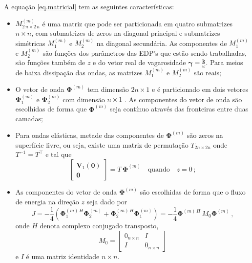 A equa\c{c}\~ao \ref{eq.matricial} tem as seguintes caracter\'isticas:
\begin{itemize}
\item $M^{(m)}_{2\,n\times2\,n}$ \'e uma matriz que pode ser particionada em quatro submatrizes $n\times n$, com submatrizes de zeros na diagonal principal e submatrizes sim\'etricas $M_1^{(m)}$ e $M_2^{(m)}$ na diagonal secund\'aria. As componentes de $M_1^{(m)}$ e $M_2^{(m)}$ s\~ao fun\c{c}\~oes dos par\^ametros das EDP's que est\~ao sendo trabalhadas, s\~ao fun\c{c}\~oes tamb\'em de $z$ e do vetor real de vagarosidade $\pmb{\gamma}=\frac{\mathbf{k}}{\omega}$. Para meios de baixa dissipa\c{c}\~ao das ondas, as matrizes $M_1^{(m)}$ e $M_2^{(m)}$ s\~ao reais; 
\item O vetor de onda $\mathbf{\Phi}^{(m)}$ tem dimens\~ao $2n\times1$ e \'e particionado em dois vetores $\mathbf{\Phi}^{(m)}_1$ e $\mathbf{\Phi}^{(m)}_2$ com dimens\~ao $n\times1$ . As componentes do vetor de onda s\~ao escolhidas de forma que $\mathbf{\Phi}^{(m)}$ seja cont\'inuo atrav\'es das fronteiras entre duas camadas;
\item  Para ondas el\'asticas, metade das componentes de $\mathbf{\Phi}^{(m)}$ s\~ao zeros na superf\'icie livre, ou seja, existe uma matriz de permuta\c{c}\~ao $T_{2n\times2n}$ onde $T^{-1}=T^\top$ e tal que
\begin{equation*}
\begin{bmatrix}
\mathbf{V}_1(\mathbf{0})\\
\mathbf{0}
\end{bmatrix}
=T\,\mathbf{\Phi}^{(m)}\quad\text{quando}\quad z = 0\,;
\end{equation*}
\item As componentes do vetor de onda $\mathbf{\Phi}^{(m)}$ s\~ao escolhidas de forma que o fluxo de energia na dire\c{c}\~ao $z$ seja dado por
\begin{equation*}
J=-\frac{1}{4}(\mathbf{\Phi}_1^{(m)\,H}\mathbf{\Phi}^{(m)}_2+\mathbf{\Phi}_2^{(m)\,H}\mathbf{\Phi}^{(m)}_1)=-\frac{1}{4}\mathbf{\Phi}^{(m)\,H}\,M_0\mathbf{\Phi}^{(m)}\,,
\end{equation*}
onde $H$ denota complexo conjugado transposto,
\begin{equation*}
M_0=
\begin{bmatrix}
0_{n\times n}&I\\
I&0_{n\times n}
\end{bmatrix}
\end{equation*}
e $I$ \'e uma matriz identidade $n\times n$.
\end{itemize}

